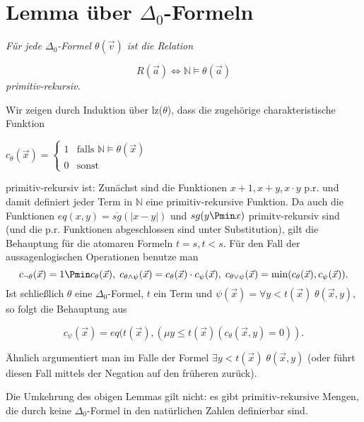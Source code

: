 \section{Lemma über $\Delta_0$-Formeln} \label{delta0formeln}
\emph{Für jede $\Delta_0$-Formel $\theta(\vec{v})$ ist die Relation}

\begin{equation*}
R(\vec{a}) \iff \mathbb{N} \models \theta(\vec{a})
\end{equation*}
  \emph{primitiv-rekursiv.}
  
  \begin{Beweis}
Wir zeigen durch Induktion über lz($\theta$), dass die zugehörige charakteristische Funktion

\medskip

$c_{\theta}(\vec{x}) = 
\begin{cases}
    1  &  \text{falls } \mathbb{N} \models \theta(\vec{x})\\
    0   &   \text{sonst}
\end{cases}$

\medskip

\noindent primitiv-rekursiv ist: Zunächst sind die Funktionen $x+1, x+y, x \cdot y$ p.r. und damit definiert jeder Term in $\mathbb{N}$ eine primitiv-rekursive Funktion. Da auch die Funktionen $eq(x,y)=\overline{sg}(|x-y|)$ und $sg(y \Pmin x)$ primitv-rekursiv sind (und die p.r. Funktionen abgeschlossen sind unter Substitution), gilt die Behauptung für die atomaren Formeln $t=s, t < s$. Für den Fall der aussagenlogischen Operationen  benutze man
\begin{equation*}
c_{\neg \theta}(\vec{x}) = 1 \Pmin c_{\theta}(\vec{x}),  \; c_{\theta \wedge \psi}(\vec{x}) = c_{\theta}(\vec{x}) \cdot c_{\psi}(\vec{x}), \; c_{\theta \vee \psi}(\vec{x}) = \min(c_{\theta}(\vec{x}),c_{\psi}(\vec{x})).
\end{equation*}
Ist schließlich $\theta$ eine $\Delta_0$-Formel, $t$ ein Term und $\psi(\vec{x}) = \forall y < t(\vec{x}) \; \theta(\vec{x},y)$, so folgt die Behauptung aus

\begin{equation*}
c_{ \psi}(\vec{x}) = eq( t(\vec{x}) , (\mu y \le t(\vec{x}) (c_{\theta}(\vec{x},y) = 0)).
\end{equation*}

\noindent Ähnlich argumentiert man im Falle der Formel  $ \exists y < t(\vec{x}) \; \theta(\vec{x},y)$ (oder führt diesen Fall mittels der Negation auf den früheren zurück).
\end{Beweis}

Die Umkehrung des obigen Lemmas gilt nicht: es gibt primitiv-rekursive Mengen, die durch keine $\Delta_0$-Formel in den natürlichen Zahlen definierbar sind. 
